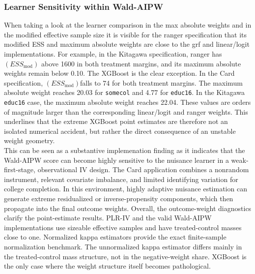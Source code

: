 \documentclass[12pt, a4paper, oneside]{article}
\theoremstyle{plain}
\theoremstyle{definition}
\begin{document}
\subsubsection{Learner Sensitivity within Wald-AIPW}
When taking a look at the learner comparison in the max absolute weights and in the modified effective sample size it is visible for the ranger specification that its modified ESS and maximum absolute weights are close to the grf and linear/logit implementations. For example, in the Kitagawa specification, ranger has $(ESS_{\mathrm{mod}})$ above 1600 in both treatment margins, and its maximum absolute weights remain below 0.10.
The XGBoost is the clear exception. In the Card specification, $(ESS_{\mathrm{mod}}) $falls to 74 for both treatment margins. The maximum absolute weight reaches 20.03 for \texttt{somecol} and 4.77 for \texttt{educ16}. In the Kitagawa \texttt{educ16} case, the maximum absolute weight reaches 22.04. These values are orders of magnitude larger than the corresponding linear/logit and ranger weights.
This underlines that the extreme XGBoost point estimates are therefore not an isolated numerical accident, but rather the direct consequence of an unstable weight geometry.\\
This can be seen as a substantive implemenation finding as it indicates that the Wald-AIPW score can become highly sensitive to the nuisance learner in a weak-first-stage, observational IV design.
The Card application combines a nonrandom instrument, relevant covariate imbalance, and limited identifying variation for college completion. In this environment, highly adaptive nuisance estimation can generate extreme residualized or inverse-propensity components, which then propagate into the final outcome weights.
Overall, the outcome-weight diagnostics clarify the point-estimate results. PLR-IV and the valid Wald-AIPW implementations use sizeable effective samples and have treated-control masses close to one. Normalized kappa estimators provide the exact finite-sample normalization benchmark. The unnormalized kappa estimator differs mainly in the treated-control mass structure, not in the negative-weight share. XGBoost is the only case where the weight structure itself becomes pathological.
\end{document}
